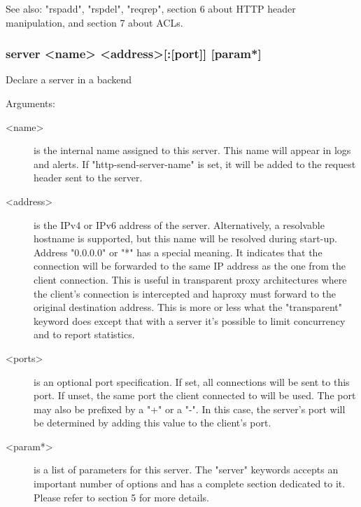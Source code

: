   See also: "rspadd", "rspdel", "reqrep", section 6 about HTTP header
            manipulation, and section 7 about ACLs.

\subsubsection[server]{server <name> <address>[:[port]] [param*]}


  Declare a server in a backend


  Arguments:
  \begin{description}
  \item[<name>] is the internal name assigned to this server. This name will
              appear in logs and alerts.  If "http-send-server-name" is
              set, it will be added to the request header sent to the server.

  \item[<address>] is the IPv4 or IPv6 address of the server. Alternatively, a
              resolvable hostname is supported, but this name will be resolved
              during start-up. Address "0.0.0.0" or "*" has a special meaning.
              It indicates that the connection will be forwarded to the same IP
              address as the one from the client connection. This is useful in
              transparent proxy architectures where the client's connection is
              intercepted and haproxy must forward to the original destination
              address. This is more or less what the "transparent" keyword does
              except that with a server it's possible to limit concurrency and
              to report statistics.

   \item[<ports>] is an optional port specification. If set, all connections will
              be sent to this port. If unset, the same port the client
              connected to will be used. The port may also be prefixed by a "+"
              or a "-". In this case, the server's port will be determined by
              adding this value to the client's port.

  \item[<param*>] is a list of parameters for this server. The "server" keywords
              accepts an important number of options and has a complete section
              dedicated to it. Please refer to section 5 for more details.
  \end{description}


